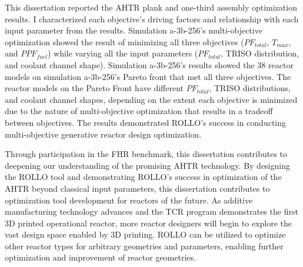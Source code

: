 This dissertation reported the \gls{AHTR} plank and one-third assembly optimization 
results. 
I characterized each objective's driving factors and relationship with each input 
parameter from the results. 
Simulation a-3b-256's multi-objective optimization showed the result of minimizing all 
three objectives ($PF_{total}$, $T_{max}$, and $PPF_{fuel}$) while varying 
all the input parameters ($PF_{total}$, TRISO distribution, and coolant channel shape).
Simulation a-3b-256's results showed the 38 reactor models on simulation 
a-3b-256's Pareto front that met all three objectives. 
The reactor models on the Pareto Front have different $PF_{total}$, TRISO distributions, 
and coolant channel shapes, depending on the extent each objective is minimized due 
to the nature of multi-objective optimization that results in a tradeoff between 
objectives. 
The results demonstrated \gls{ROLLO}'s success in conducting multi-objective generative 
reactor design optimization. 

Through participation in the \gls{FHR} benchmark, this dissertation contributes to 
deepening our understanding of the promising \gls{AHTR} technology. 
By designing the \gls{ROLLO} tool and demonstrating \gls{ROLLO}'s success in 
optimization of the \gls{AHTR} beyond classical input parameters, this dissertation 
contributes to optimization tool development for reactors of the future. 
As additive manufacturing technology advances and the \gls{TCR} program 
demonstrates the first 3D printed operational reactor, more reactor designers 
will begin to explore the vast design space enabled by 3D printing. 
\gls{ROLLO} can be utilized to optimize other reactor types for arbitrary
geometries and parameters, enabling further optimization and improvement of reactor 
geometries.